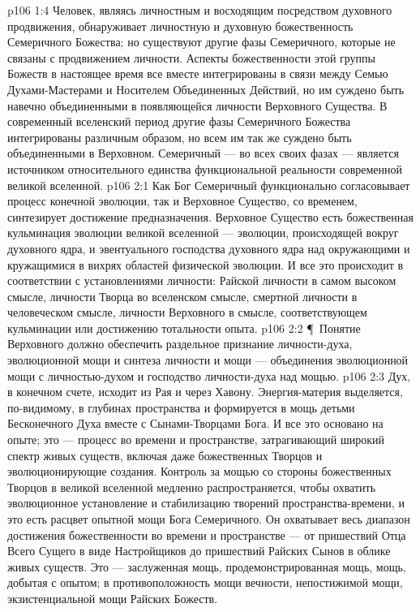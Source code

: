 \vs p106 1:4 Человек, являясь личностным и восходящим посредством духовного продвижения, обнаруживает личностную и духовную божественность Семеричного Божества; но существуют другие фазы Семеричного, которые не связаны с продвижением личности. Аспекты божественности этой группы Божеств в настоящее время все вместе интегрированы в связи между Семью Духами\hyp{}Мастерами и Носителем Объединенных Действий, но им суждено быть навечно объединенными в появляющейся личности Верховного Существа. В современный вселенский период другие фазы Семеричного Божества интегрированы различным образом, но всем им так же суждено быть объединенными в Верховном. Семеричный --- во всех своих фазах --- является источником относительного единства функциональной реальности современной великой вселенной.
\vs p106 2:1 Как Бог Семеричный функционально согласовывает процесс конечной эволюции, так и Верховное Существо, со временем, синтезирует достижение предназначения. Верховное Существо есть божественная кульминация эволюции великой вселенной --- эволюции, происходящей вокруг духовного ядра, и эвентуального господства духовного ядра над окружающими и кружащимися в вихрях областей физической эволюции. И все это происходит в соответствии с установлениями личности: Райской личности в самом высоком смысле, личности Творца во вселенском смысле, смертной личности в человеческом смысле, личности Верховного в смысле, соответствующем кульминации или достижению тотальности опыта.
\vs p106 2:2 \P\ Понятие Верховного должно обеспечить раздельное признание личности\hyp{}духа, эволюционной мощи и синтеза личности и мощи --- объединения эволюционной мощи с личностью\hyp{}духом и господство личности\hyp{}духа над мощью.
\vs p106 2:3 Дух, в конечном счете, исходит из Рая и через Хавону. Энергия\hyp{}материя выделяется, по\hyp{}видимому, в глубинах пространства и формируется в мощь детьми Бесконечного Духа вместе с Сынами\hyp{}Творцами Бога. И все это основано на опыте; это --- процесс во времени и пространстве, затрагивающий широкий спектр живых существ, включая даже божественных Творцов и эволюционирующие создания. Контроль за мощью со стороны божественных Творцов в великой вселенной медленно распространяется, чтобы охватить эволюционное установление и стабилизацию творений пространства\hyp{}времени, и это есть расцвет опытной мощи Бога Семеричного. Он охватывает весь диапазон достижения божественности во времени и пространстве --- от пришествий Отца Всего Сущего в виде Настройщиков до пришествий Райских Сынов в облике живых существ. Это --- заслуженная мощь, продемонстрированная мощь, мощь, добытая с опытом; в противоположность мощи вечности, непостижимой мощи, экзистенциальной мощи Райских Божеств.
